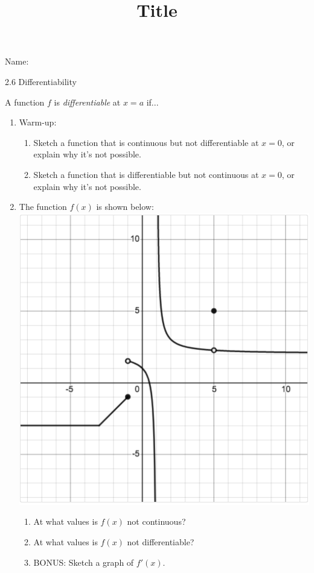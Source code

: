 \documentclass[12pt]{article}
\title{Title}
\begin{document}
 Name:
 \begin{center}\large{2.6 Differentiability}\end{center}

\begin{tcolorbox}
A function $f$ is \textit{differentiable} at $x=a$ if...
\vspace{20mm}
\end{tcolorbox}

\begin{enumerate}

\item Warm-up:
	\begin{enumerate}
	\item Sketch a function that is continuous but not differentiable at $x=0$, or explain why it's not possible.
	\vfill
	\item Sketch a function that is differentiable but not continuous at $x=0$, or explain why it's not possible.
	\vfill
	\end{enumerate}
	
\item The function $f(x)$ is shown below:\\
\includegraphics[scale=.6]{2_6_g1}
	\begin{enumerate}
	\item At what values is $f(x)$ not continuous?
	\item At what values is $f(x)$ not differentiable?
	\item BONUS: Sketch a graph of $f'(x)$.
	\end{enumerate}


\end{enumerate}
\end{document}
